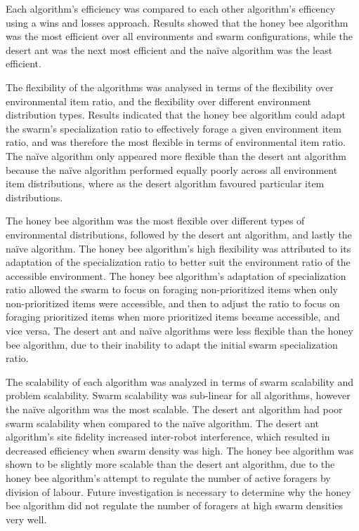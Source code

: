 \documentclass[preprint,12pt]{elsarticle}
\begin{document}
Each algorithm's efficiency was compared to each other algorithm's efficency using a wins and losses approach. Results showed that the honey bee algorithm was the most efficient over all environments and swarm configurations, while the desert ant was the next most efficient and the na\"ive algorithm was the least efficient.

The flexibility of the algorithms was analysed in terms of the flexibility over environmental item ratio, and the flexibility over different environment distribution types. Results indicated that the honey bee algorithm could adapt the swarm's specialization ratio to effectively forage a given environment item ratio, and was therefore the most flexible in terms of environmental item ratio. The na\"ive algorithm only appeared more flexible than the desert ant algorithm because the na\"ive algorithm performed equally poorly across all environment item distributions, where as the desert algorithm favoured particular item distributions.

The honey bee algorithm was the most flexible over different types of environmental distributions, followed by the desert ant algorithm, and lastly the na\"ive algorithm. The honey bee algorithm's high flexibility was attributed to its adaptation of the specialization ratio to better suit the environment ratio of the accessible environment. The honey bee algorithm's adaptation of specialization ratio allowed the swarm to focus on foraging non-prioritized items when only non-prioritized items were accessible, and then to adjust the ratio to focus on foraging prioritized items when more prioritized items became accessible, and vice versa. The desert ant and na\"ive algorithms were less flexible than the honey bee algorithm, due to their inability to adapt the initial swarm specialization ratio.

The scalability of each algorithm was analyzed in terms of swarm scalability and problem scalability. Swarm scalability was sub-linear for all algorithms, however the na\"ive algorithm was the most scalable. The desert ant algorithm had poor swarm scalability when compared to the na\"ive algorithm. The desert ant algorithm's site fidelity increased inter-robot interference, which resulted in decreased efficiency when swarm density was high. The honey bee algorithm was shown to be slightly more scalable than the desert ant algorithm, due to the honey bee algorithm's attempt to regulate the number of active foragers by division of labour. Future investigation is necessary to determine why the honey bee algorithm did not regulate the number of foragers at high swarm densities very well. 
\end{document}
